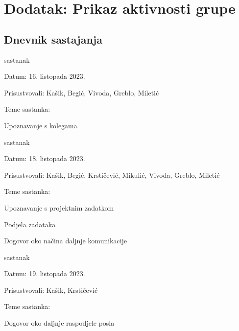 \chapter*{Dodatak: Prikaz aktivnosti grupe}

\section*{Dnevnik sastajanja}


\begin{packed_enum}
	\item  sastanak
	
	\item[] \begin{packed_item}
		\item Datum: 16. listopada 2023.
		\item Prisustvovali: Kašik, Begić, Vivoda, Greblo, Miletić
		\item Teme sastanka:
		\begin{packed_item}
			\item  Upoznavanje s kolegama
		\end{packed_item}
	\end{packed_item}
	
	\item  sastanak
	\item[] \begin{packed_item}
		\item Datum: 18. listopada 2023.
		\item Prisustvovali: Kašik, Begić, Krstičević, Mikulić, Vivoda, Greblo, Miletić
		\item Teme sastanka:
		\begin{packed_item}
			\item  Upoznavanje s projektnim zadatkom
			\item  Podjela zadataka
			\item  Dogovor oko načina daljnje komunikacije
		\end{packed_item}
	\end{packed_item}
	
	\item  sastanak
	\item[] \begin{packed_item}
		\item Datum: 19. listopada 2023.
		\item Prisustvovali: Kašik, Krstičević
		\item Teme sastanka:
		\begin{packed_item}
			\item  Dogovor oko daljnje raspodjele posla
		\end{packed_item}
	\end{packed_item}
	

\end{packed_enum}
